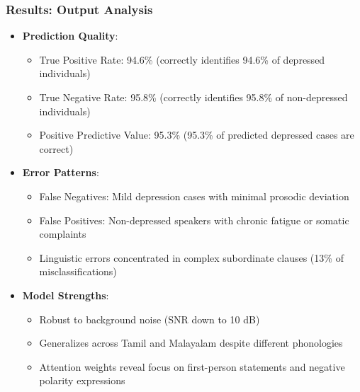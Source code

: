\documentclass{beamer}
\begin{document}
\begin{frame}
\frametitle{Results: Output Analysis}
\begin{itemize}
    \item \textbf{Prediction Quality}:
    \begin{itemize}
        \item True Positive Rate: 94.6\% (correctly identifies 94.6\% of depressed individuals)
        \item True Negative Rate: 95.8\% (correctly identifies 95.8\% of non-depressed individuals)
        \item Positive Predictive Value: 95.3\% (95.3\% of predicted depressed cases are correct)
    \end{itemize}
    \item \textbf{Error Patterns}:
    \begin{itemize}
        \item False Negatives: Mild depression cases with minimal prosodic deviation
        \item False Positives: Non-depressed speakers with chronic fatigue or somatic complaints
        \item Linguistic errors concentrated in complex subordinate clauses (13\% of misclassifications)
    \end{itemize}
    \item \textbf{Model Strengths}:
    \begin{itemize}
        \item Robust to background noise (SNR down to 10 dB)
        \item Generalizes across Tamil and Malayalam despite different phonologies
        \item Attention weights reveal focus on first-person statements and negative polarity expressions
    \end{itemize}
\end{itemize}
\end{frame}
\end{document}
